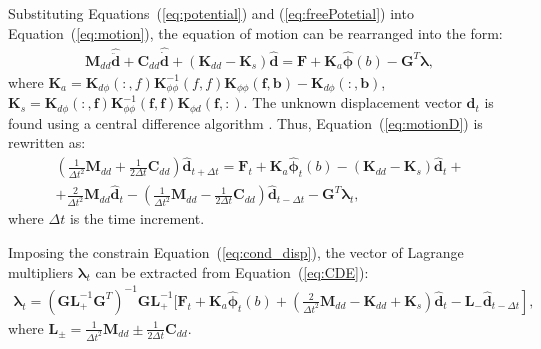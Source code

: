 Substituting Equations~(\ref{eq:potential}) and (\ref{eq:freePotetial}) into Equation~(\ref{eq:motion}), the equation of motion can be rearranged into the form:
\begin{eqnarray}
	\textbf{M}_{dd} \widehat{\ddot{\textbf{d}}} + \textbf{C}_{dd} \widehat{\dot{\textbf{d}}} + (\textbf{K}_{dd}-\textbf{K}_{s}) \widehat{\textbf{d}}  = \textbf{F} + \textbf{K}_{a} \widehat{\boldsymbol{\phi}}(b) - \textbf{G}^T \boldsymbol{\lambda},
	\label{eq:motionD}
\end{eqnarray}
where  \(\textbf{K}_a=\textbf{K}_{d\phi}(:,f)\textbf{K}_{\phi \phi}^{-1}(f,f)\textbf{K}_{\phi \phi}(\textbf{f},\textbf{b})-\textbf{K}_{d\phi}(:,\textbf{b})\), \(\textbf{K}_s=\textbf{K}_{d \phi}(:,\textbf{f})\textbf{K}_{\phi \phi}^{-1}(\textbf{f},\textbf{f})\textbf{K}_{\phi d}(\textbf{f},:)\).
The unknown displacement vector \(\widehat{\textbf{d}}_t\) is found using a central difference algorithm \cite{kudela20093d}.
Thus, Equation~(\ref{eq:motionD}) is rewritten as:
\begin{equation}
	\begin{array}{c}
		\left(\frac{1}{\Delta t^2}\textbf{M}_{dd}+\frac{1}{2\Delta t}\textbf{C}_{dd} \right)\widehat{\textbf{d}}_{t+\Delta t}=
		\textbf{F}_t+\textbf{K}_a\widehat{\boldsymbol{\phi}}_t(b)-\left( \textbf{K}_{dd}-\textbf{K}_s\right)\widehat{\textbf{d}}_t+\\
		+\frac{2}{\Delta t^2}\textbf{M}_{dd}\widehat{\textbf{d}}_t-\left(\frac{1}{\Delta t^2}\textbf{M}_{dd}-\frac{1}{2\Delta t}\textbf{C}_{dd}\right)\widehat{\textbf{d}}_{t-\Delta t}-\textbf{G}^T\boldsymbol{\lambda}_t,
	\end{array}
	\label{eq:CDE}
\end{equation}
where \(\Delta t\) is the time increment.

Imposing the constrain Equation~(\ref{eq:cond_disp}), the vector of Lagrange multipliers \(\boldsymbol{\lambda}_t\) can be extracted from Equation~(\ref{eq:CDE}): 
\begin{eqnarray}
	\boldsymbol{\lambda}_t = {\left(\textbf{G}\textbf{L}_+^{-1}\textbf{G}^T \right)}^{-1}\textbf{G}\textbf{L}_+^{-1} \Bigg[ \textbf{F}_t+\textbf{K}_a\widehat{\boldsymbol{\phi}}_t(b)+\left.\left(\frac{2}{\Delta t^2}\textbf{M}_{dd}-\textbf{K}_{dd}+\textbf{K}_s\right)\widehat{\textbf{d}}_t -\textbf{L}_-\widehat{\textbf{d}}_{t-\Delta t} \right],
	\label{eq:lambda}
\end{eqnarray}
where \(\textbf{L}_{\pm}=\frac{1}{\Delta t^2}\textbf{M}_{dd}\pm\frac{1}{2\Delta t}\textbf{C}_{dd}\).